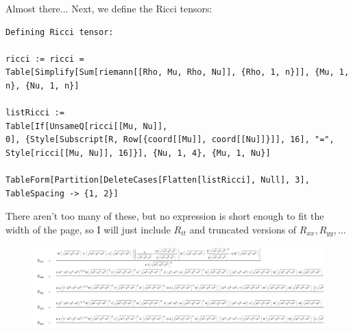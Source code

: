 \documentclass{book}
\theoremstyle{definition}
\begin{document}
Almost there... Next, we define the Ricci tensors:
\begin{lstlisting}
Defining Ricci tensor:

ricci := ricci = 
Table[Simplify[Sum[riemann[[Rho, Mu, Rho, Nu]], {Rho, 1, n}]], {Mu, 1, 
n}, {Nu, 1, n}]

listRicci := 
Table[If[UnsameQ[ricci[[Mu, Nu]], 
0], {Style[Subscript[R, Row[{coord[[Mu]], coord[[Nu]]}]], 16], "=", 
Style[ricci[[Mu, Nu]], 16]}], {Nu, 1, 4}, {Mu, 1, Nu}]

TableForm[Partition[DeleteCases[Flatten[listRicci], Null], 3], 
TableSpacing -> {1, 2}]
\end{lstlisting}
There aren't too many of these, but no expression is short enough to fit the width of the page, so I will just include $R_{tt}$ and truncated versions of $R_{xx}, R_{yy},\dots$
\begin{figure}[!htb]
	\centering
	\includegraphics[scale=0.3]{riccitensors}
\end{figure}
\end{document}
